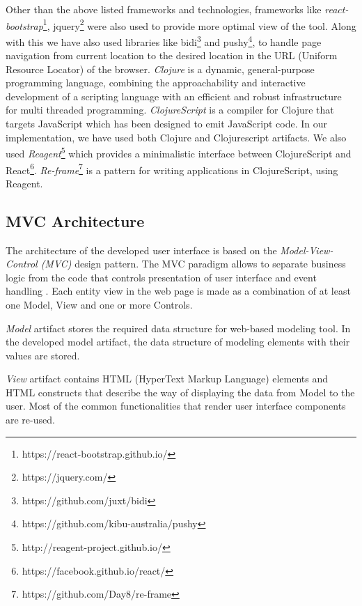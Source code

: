 Other than the above listed frameworks and technologies, frameworks like \textit{react-bootstrap}\footnote{https://react-bootstrap.github.io/}, jquery\footnote{https://jquery.com/} were also used to provide more optimal view of the tool. Along with this we have also used libraries like bidi\footnote{https://github.com/juxt/bidi} and pushy\footnote{https://github.com/kibu-australia/pushy}, to handle page navigation from current location to the desired location in the URL (Uniform Resource Locator) of the browser. \textit{Clojure} is a dynamic, general-purpose programming language, combining the approachability and interactive development of a scripting language with an efficient and robust infrastructure for multi threaded programming. \textit{ClojureScript} is a compiler for Clojure that targets JavaScript which has been designed to emit JavaScript code. In our implementation, we have used both Clojure and Clojurescript artifacts. We also used \textit{Reagent}\footnote{http://reagent-project.github.io/} which provides a minimalistic interface between ClojureScript and React\footnote{https://facebook.github.io/react/}. \textit{Re-frame}\footnote{https://github.com/Day8/re-frame} is a pattern for writing applications in ClojureScript, using Reagent.

\subsection{MVC Architecture}
\label{subsec:mvcarch}
The architecture of the developed user interface is based on the \textit{Model-View-Control (MVC)} design pattern. The MVC paradigm allows to separate business logic from the code that controls presentation of user interface and event handling \cite{Oracle2016}. Each entity view in the web page is made as a combination of at least one Model, View and one or more Controls. 

\textit{Model} artifact stores the required data structure for web-based modeling tool. In the developed model artifact, the data structure of modeling elements with their values are stored. 

\textit{View} artifact contains HTML (HyperText Markup Language) elements and HTML constructs that describe the way of displaying the data from Model to the user. Most of the common functionalities that render user interface components are re-used. 

